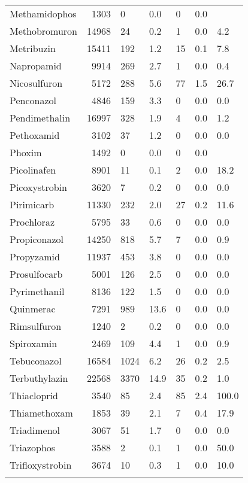\begin{longtable}{p{3cm}rR{1.4cm}R{1.4cm}R{1.4cm}R{1.4cm}R{1.4cm}}
  Methamidophos & 1303 &  0 & 0.0 &  0 & 0.0 &  \\ 
  Methobromuron & 14968 & 24 & 0.2 &  1 & 0.0 & 4.2 \\ 
  Metribuzin & 15411 & 192 & 1.2 & 15 & 0.1 & 7.8 \\ 
  Napropamid & 9914 & 269 & 2.7 &  1 & 0.0 & 0.4 \\ 
  Nicosulfuron & 5172 & 288 & 5.6 & 77 & 1.5 & 26.7 \\ 
  Penconazol & 4846 & 159 & 3.3 &  0 & 0.0 & 0.0 \\ 
  Pendimethalin & 16997 & 328 & 1.9 &  4 & 0.0 & 1.2 \\ 
  Pethoxamid & 3102 & 37 & 1.2 &  0 & 0.0 & 0.0 \\ 
  Phoxim & 1492 &  0 & 0.0 &  0 & 0.0 &  \\ 
  Picolinafen & 8901 & 11 & 0.1 &  2 & 0.0 & 18.2 \\ 
  Picoxystrobin & 3620 &  7 & 0.2 &  0 & 0.0 & 0.0 \\ 
  Pirimicarb & 11330 & 232 & 2.0 & 27 & 0.2 & 11.6 \\ 
  Prochloraz & 5795 & 33 & 0.6 &  0 & 0.0 & 0.0 \\ 
  Propiconazol & 14250 & 818 & 5.7 &  7 & 0.0 & 0.9 \\ 
  Propyzamid & 11937 & 453 & 3.8 &  0 & 0.0 & 0.0 \\ 
  Prosulfocarb & 5001 & 126 & 2.5 &  0 & 0.0 & 0.0 \\ 
  Pyrimethanil & 8136 & 122 & 1.5 &  0 & 0.0 & 0.0 \\ 
  Quinmerac & 7291 & 989 & 13.6 &  0 & 0.0 & 0.0 \\ 
  Rimsulfuron & 1240 &  2 & 0.2 &  0 & 0.0 & 0.0 \\ 
  Spiroxamin & 2469 & 109 & 4.4 &  1 & 0.0 & 0.9 \\ 
  Tebuconazol & 16584 & 1024 & 6.2 & 26 & 0.2 & 2.5 \\ 
  Terbuthylazin & 22568 & 3370 & 14.9 & 35 & 0.2 & 1.0 \\ 
  Thiacloprid & 3540 & 85 & 2.4 & 85 & 2.4 & 100.0 \\ 
  Thiamethoxam & 1853 & 39 & 2.1 &  7 & 0.4 & 17.9 \\ 
  Triadimenol & 3067 & 51 & 1.7 &  0 & 0.0 & 0.0 \\ 
  Triazophos & 3588 &  2 & 0.1 &  1 & 0.0 & 50.0 \\ 
  Trifloxystrobin & 3674 & 10 & 0.3 &  1 & 0.0 & 10.0 \\ 
   \bottomrule
\label{tab:rac_dat}
\end{longtable}
